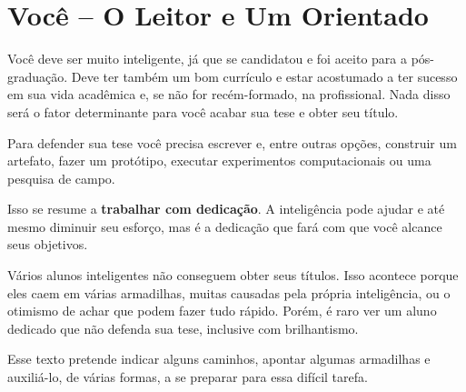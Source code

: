 \section{Você – O Leitor e Um Orientado}

Você deve ser muito inteligente, já que se candidatou e foi aceito para a pós-graduação. Deve ter também um bom currículo e estar acostumado a ter sucesso em sua vida acadêmica e, se não for recém-formado, na profissional.
Nada disso será o fator determinante para você acabar sua tese e obter seu título.

Para defender sua tese você precisa escrever e, entre outras opções, construir um artefato, fazer um protótipo, executar experimentos computacionais ou uma pesquisa de campo.

Isso se resume a \textbf{trabalhar com dedicação}. A inteligência pode ajudar e até mesmo diminuir seu esforço, mas é a dedicação que fará com que você alcance seus objetivos.

Vários alunos inteligentes não conseguem obter seus títulos. Isso acontece porque eles caem em várias armadilhas, muitas causadas pela própria inteligência, ou o otimismo de achar que podem fazer tudo rápido. Porém, é raro ver um aluno dedicado que não defenda sua tese, inclusive com brilhantismo.

Esse texto pretende indicar alguns caminhos, apontar algumas armadilhas e auxiliá-lo, de várias formas, a se preparar para essa difícil tarefa.

